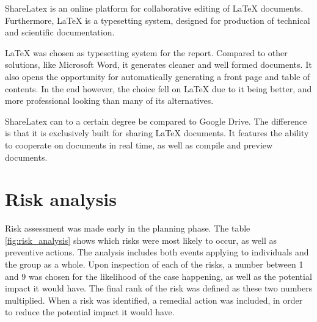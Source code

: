 ShareLatex \cite{sharelatex} is an online platform for collaborative editing of LaTeX documents. Furthermore, LaTeX is a typesetting system, designed for production of technical and scientific documentation.

LaTeX was chosen as typesetting system for the report. Compared to other solutions, like Microsoft Word, it generates cleaner and well formed documents. It also opens the opportunity for automatically generating a front page and table of contents. In the end however, the choice fell on LaTeX due to it being better, and more professional looking than many of its alternatives.

ShareLatex can to a certain degree be compared to Google Drive. The difference is that it is exclusively built for sharing LaTeX documents. It features the ability to cooperate on documents in real time, as well as compile and preview documents.

\section{Risk analysis}
\label{sec:prestudies-risk_analysis}

Risk assessment was made early in the planning phase. The table \ref{fig:risk_analysis} shows which risks were most likely to occur, as well as preventive actions. The analysis includes both events applying to individuals and the group as a whole. Upon inspection of each of the risks, a number between 1 and 9 was chosen for the likelihood of the case happening, as well as the potential impact it would have. The final rank of the risk was defined as these two numbers multiplied. When a risk was identified, a remedial action was included, in order to reduce the potential impact it would have.


